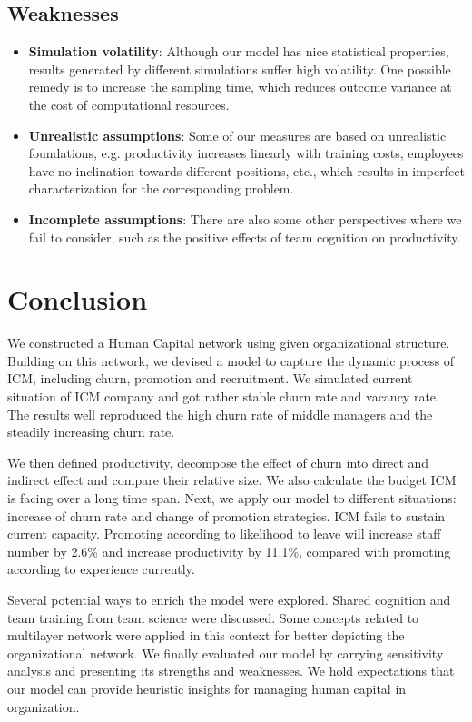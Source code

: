 \documentclass[tcn = 37075, sheet = false, abstract = false]{mcmthesis}
\begin{document}
\subsection{Weaknesses}
\begin{itemize}
\item \textbf{Simulation volatility}: Although our model has nice statistical properties, results generated by different simulations suffer high volatility. One possible remedy is to increase the sampling time, which reduces outcome variance at the cost of computational resources.

\item \textbf{Unrealistic assumptions}: Some of our measures are based on unrealistic foundations, e.g. productivity increases linearly with training costs, employees have no inclination towards different positions, etc., which results in imperfect characterization for the corresponding problem.

\item \textbf{Incomplete assumptions}: There are also some other perspectives where we fail to consider, such as the positive effects of team cognition on productivity. 
\end{itemize}


\section{Conclusion}

We constructed a Human Capital network using given organizational structure. Building on this network, we devised a model to capture the dynamic process of ICM, including churn, promotion and recruitment. We simulated current situation of ICM company and got rather stable churn rate and vacancy rate. The results well reproduced the high churn rate of middle managers and the steadily increasing churn rate.

We then defined productivity, decompose the effect of churn into direct and indirect effect and compare their relative size. We also calculate the budget ICM is facing over a long time span. Next, we apply our model to different situations: increase of churn rate and change of promotion strategies. ICM fails to sustain current capacity. Promoting according to likelihood to leave will increase staff number by 2.6\% and increase productivity by 11.1\%, compared with promoting according to experience currently.

Several potential ways to enrich the model were explored. Shared cognition and team training from team science were discussed. Some concepts related to multilayer network were applied in this context for better depicting the organizational network. We finally evaluated our model by carrying sensitivity analysis and presenting
its strengths and weaknesses. We hold expectations that our model can provide heuristic insights for managing human capital in organization.



\end{document}

